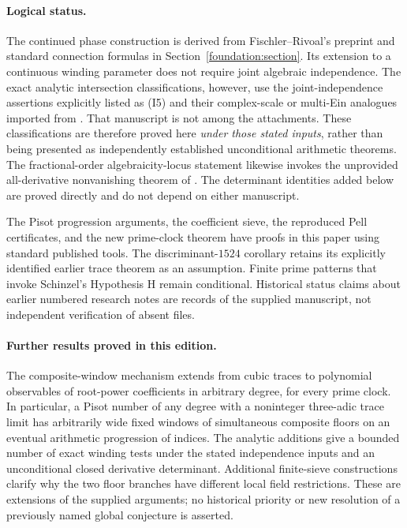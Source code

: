 \documentclass[11pt,a4paper]{article}
\theoremstyle{definition}\newtheorem{definition}[theorem]{Definition}
\theoremstyle{remark}\newtheorem{remark}[theorem]{Remark}
\begin{document}
\paragraph{Logical status.}
The continued phase construction is derived from Fischler--Rivoal's preprint
and standard connection formulas in Section~\ref{foundation:section}.
Its extension to a continuous winding parameter does not require joint
algebraic independence. The exact analytic intersection classifications,
however, use the joint-independence assertions explicitly listed as (I5)
and their complex-scale or multi-Ein analogues imported from \cite{EB}.
That manuscript is not among the attachments. These classifications are
therefore proved here \emph{under those stated inputs}, rather than being
presented as independently established unconditional arithmetic theorems.
The fractional-order algebraicity-locus statement likewise invokes the
unprovided all-derivative nonvanishing theorem of \cite{BR}.
The determinant identities added below are proved directly and do not
depend on either manuscript.

The Pisot progression arguments, the coefficient sieve, the reproduced
Pell certificates, and the new prime-clock theorem have proofs in this
paper using standard published tools. The discriminant-$1524$ corollary
retains its explicitly identified earlier trace theorem as an assumption.
Finite prime patterns that invoke Schinzel's Hypothesis H remain conditional.
Historical status claims about earlier numbered research notes are records
of the supplied manuscript, not independent verification of absent files.

\paragraph{Further results proved in this edition.}
The composite-window mechanism extends from cubic traces to polynomial
observables of root-power coefficients in arbitrary degree, for every prime
clock. In particular, a Pisot number of any degree with a noninteger
three-adic trace limit has arbitrarily wide fixed windows of simultaneous
composite floors on an eventual arithmetic progression of indices.
The analytic additions give a bounded number of exact winding tests under
the stated independence inputs and an unconditional closed derivative
determinant. Additional finite-sieve constructions clarify why the two
floor branches have different local field restrictions.
These are extensions of the supplied arguments; no historical priority
or new resolution of a previously named global conjecture is asserted.
\end{document}
